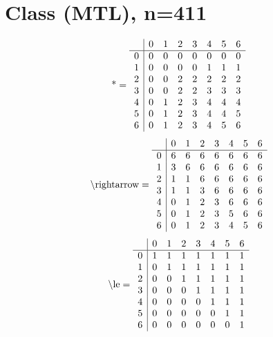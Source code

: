 \documentclass[11pt]{article}
\begin{document}
\section{Class (MTL), n=411}
\[\text{*} = 
\begin{array}{r | r r r r r r r}
 & 0 & 1 & 2 & 3 & 4 & 5 & 6 \\ \hline
0 & 0 & 0 & 0 & 0 & 0 & 0 & 0 \\
1 & 0 & 0 & 0 & 0 & 1 & 1 & 1 \\
2 & 0 & 0 & 2 & 2 & 2 & 2 & 2 \\
3 & 0 & 0 & 2 & 2 & 3 & 3 & 3 \\
4 & 0 & 1 & 2 & 3 & 4 & 4 & 4 \\
5 & 0 & 1 & 2 & 3 & 4 & 4 & 5 \\
6 & 0 & 1 & 2 & 3 & 4 & 5 & 6 \\
\end{array}
\]
\[\text{\textbackslash rightarrow} = 
\begin{array}{r | r r r r r r r}
 & 0 & 1 & 2 & 3 & 4 & 5 & 6 \\ \hline
0 & 6 & 6 & 6 & 6 & 6 & 6 & 6 \\
1 & 3 & 6 & 6 & 6 & 6 & 6 & 6 \\
2 & 1 & 1 & 6 & 6 & 6 & 6 & 6 \\
3 & 1 & 1 & 3 & 6 & 6 & 6 & 6 \\
4 & 0 & 1 & 2 & 3 & 6 & 6 & 6 \\
5 & 0 & 1 & 2 & 3 & 5 & 6 & 6 \\
6 & 0 & 1 & 2 & 3 & 4 & 5 & 6 \\
\end{array}
\]
\[\text{\textbackslash le} = 
\begin{array}{r | r r r r r r r}
 & 0 & 1 & 2 & 3 & 4 & 5 & 6 \\ \hline
0 & 1 & 1 & 1 & 1 & 1 & 1 & 1 \\
1 & 0 & 1 & 1 & 1 & 1 & 1 & 1 \\
2 & 0 & 0 & 1 & 1 & 1 & 1 & 1 \\
3 & 0 & 0 & 0 & 1 & 1 & 1 & 1 \\
4 & 0 & 0 & 0 & 0 & 1 & 1 & 1 \\
5 & 0 & 0 & 0 & 0 & 0 & 1 & 1 \\
6 & 0 & 0 & 0 & 0 & 0 & 0 & 1 \\
\end{array}
\]
\end{document}
